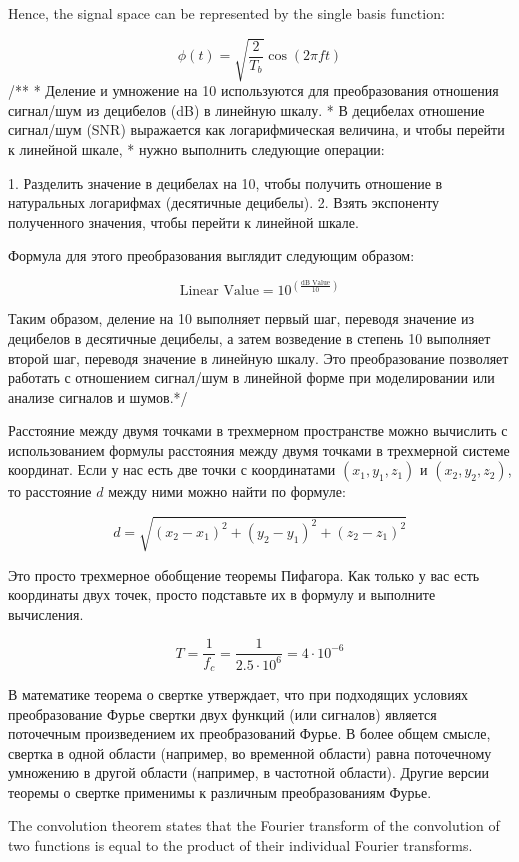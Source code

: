 \documentclass[14pt, a4paper]{extarticle}
\begin{document}
Hence, the signal space can be represented by the single basis function:

\[
\phi(t) = \sqrt{\frac{2}{T_{b}}} \cos\left(2\pi ft\right)
\]
\newpage
/**
 * Деление и умножение на 10 используются для преобразования отношения сигнал/шум из децибелов (dB) в линейную шкалу.
 * В децибелах отношение сигнал/шум (SNR) выражается как логарифмическая величина, и чтобы перейти к линейной шкале,
 * нужно выполнить следующие операции:

1. Разделить значение в децибелах на 10, чтобы получить отношение в натуральных логарифмах (десятичные децибелы).
2. Взять экспоненту полученного значения, чтобы перейти к линейной шкале.

Формула для этого преобразования выглядит следующим образом:

\[ \text{Linear Value} = 10^{\left(\frac{\text{dB Value}}{10}\right)} \]

Таким образом, деление на 10 выполняет первый шаг, переводя значение из децибелов в десятичные децибелы,
 а затем возведение в степень 10 выполняет второй шаг, переводя значение в линейную шкалу.
 Это преобразование позволяет работать с отношением сигнал/шум в линейной форме при моделировании или анализе сигналов и шумов.*/

\newpage

Расстояние между двумя точками в трехмерном пространстве можно вычислить с использованием формулы расстояния между двумя точками в трехмерной системе координат. Если у нас есть две точки с координатами \((x_1, y_1, z_1)\) и \((x_2, y_2, z_2)\), то расстояние \(d\) между ними можно найти по формуле:

\[ d = \sqrt{(x_2 - x_1)^2 + (y_2 - y_1)^2 + (z_2 - z_1)^2} \]

Это просто трехмерное обобщение теоремы Пифагора. Как только у вас есть координаты двух точек, просто подставьте их в формулу и выполните вычисления.
  
$$T = \frac{1}{f_c} = \frac{1}{2.5 \cdot 10^6} = 4 \cdot 10^{-6} $$

В математике теорема о свертке утверждает, что при подходящих условиях преобразование Фурье свертки двух функций (или сигналов) является поточечным произведением их преобразований Фурье. 
В более общем смысле, свертка в одной области (например, во временной области) равна поточечному умножению в другой области (например, в частотной области). Другие версии теоремы о свертке применимы к различным преобразованиям Фурье.

The convolution theorem states that the Fourier transform of the convolution of two functions is equal to the product of their individual Fourier transforms.
\end{document}
